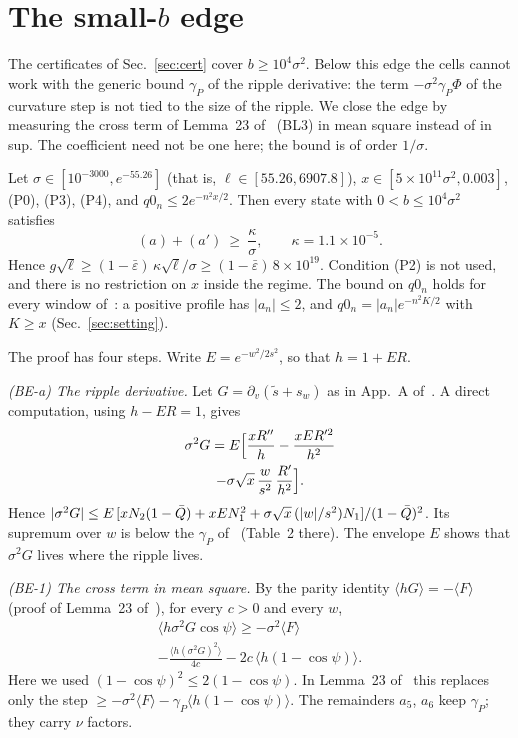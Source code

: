 \section{The small-\texorpdfstring{$b$}{b} edge}
\label{sec:bedge}

The certificates of Sec.~\ref{sec:cert} cover $b\ge10^4\sigma^2$.
Below this edge the cells cannot work with the generic bound $\gamma_P$ of the ripple derivative: the term $-\sigma^2\gamma_P\Phi$ of the curvature step is not tied to the size of the ripple.
We close the edge by measuring the cross term of Lemma~23 of~\cite{F} (BL3) in mean square instead of in sup.
The coefficient need not be one here; the bound is of order $1/\sigma$.

\begin{lemma}[Lemma BE] \proofst
\label{lem:BE}
Let $\sigma\in[10^{-3000},e^{-55.26}]$ (that is, $\ell\in[55.26,6907.8]$), $x\in[5\times10^{11}\sigma^2,0.003]$, (P0), (P3), (P4), and $q0_n\le2e^{-n^2x/2}$.
Then every state with $0<b\le10^4\sigma^2$ satisfies
\begin{equation}
(a)+(a')\ \ge\ \frac{\kappa}{\sigma},\qquad \kappa=1.1\times10^{-5}.
\end{equation}
Hence $g\sqrt\ell\ge(1-\bar\varepsilon)\,\kappa\sqrt\ell/\sigma\ge(1-\bar\varepsilon)\,8\times10^{19}$.
Condition (P2) is not used, and there is no restriction on $x$ inside the regime.
The bound on $q0_n$ holds for every window of~\cite{F}: a positive profile has $|a_n|\le2$, and $q0_n=|a_n|e^{-n^2K/2}$ with $K\ge x$ (Sec.~\ref{sec:setting}).
\end{lemma}

The proof has four steps.
Write $E=e^{-w^2/2s^2}$, so that $h=1+ER$.

\emph{(BE-a) The ripple derivative.}
Let $G=\partial_v(\tilde s+s_w)$ as in App.~A of~\cite{F}.
A direct computation, using $h-ER=1$, gives
\begin{multline}
\sigma^2G=E\Bigl[\frac{xR''}{h}-\frac{xER'^2}{h^2}\\
-\sigma\sqrt x\,\frac{w}{s^2}\,\frac{R'}{h^2}\Bigr].
\end{multline}
Hence $|\sigma^2G|\le E\,[xN_2(1-\bar Q)+xEN_1^2+\sigma\sqrt x\,(|w|/s^2)N_1]/(1-\bar Q)^2$.
Its supremum over $w$ is below the $\gamma_P$ of~\cite{F} (Table~2 there).
The envelope $E$ shows that $\sigma^2G$ lives where the ripple lives.

\emph{(BE-1) The cross term in mean square.}
By the parity identity $\langle hG\rangle=-\langle F\rangle$ (proof of Lemma~23 of~\cite{F}), for every $c>0$ and every $w$,
\begin{multline}
\langle h\sigma^2G\cos\psi\rangle\ge-\sigma^2\langle F\rangle\\
-\frac{\langle h(\sigma^2G)^2\rangle}{4c}-2c\,\langle h(1-\cos\psi)\rangle .
\end{multline}
Here we used $(1-\cos\psi)^2\le2(1-\cos\psi)$.
In Lemma~23 of~\cite{F} this replaces only the step $\ge-\sigma^2\langle F\rangle-\gamma_P\langle h(1-\cos\psi)\rangle$.
The remainders $a_5$, $a_6$ keep $\gamma_P$; they carry $\nu$ factors.

